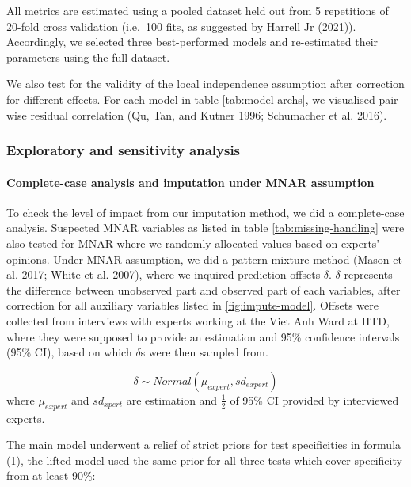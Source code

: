 \documentclass[
]{article}
\begin{document}
All metrics are estimated using a pooled dataset held out from 5 repetitions of 20-fold cross validation (i.e.~100 fits, as suggested by Harrell Jr (2021)). Accordingly, we selected three best-performed models and re-estimated their parameters using the full dataset.

We also test for the validity of the local independence assumption after correction for different effects. For each model in table \ref{tab:model-archs}, we visualised pair-wise residual correlation (Qu, Tan, and Kutner 1996; Schumacher et al. 2016).

\hypertarget{exploratory-and-sensitivity-analysis}{%
\subsubsection{Exploratory and sensitivity analysis}\label{exploratory-and-sensitivity-analysis}}

\hypertarget{complete-case-analysis-and-imputation-under-mnar-assumption}{%
\paragraph{Complete-case analysis and imputation under MNAR assumption}\label{complete-case-analysis-and-imputation-under-mnar-assumption}}

To check the level of impact from our imputation method, we did a complete-case analysis. Suspected MNAR variables as listed in table \ref{tab:missing-handling} were also tested for MNAR where we randomly allocated values based on experts' opinions. Under MNAR assumption, we did a pattern-mixture method (Mason et al. 2017; White et al. 2007), where we inquired prediction offsets \(\delta\). \(\delta\) represents the difference between unobserved part and observed part of each variables, after correction for all auxiliary variables listed in \ref{fig:impute-model}. Offsets were collected from interviews with experts working at the Viet Anh Ward at HTD, where they were supposed to provide an estimation and 95\% confidence intervals (95\% CI), based on which \(\delta\)s were then sampled from.

\[
\delta \sim Normal(\mu_{expert}, sd_{expert})
\]
where \(\mu_{expert}\) and \(sd_{xpert}\) are estimation and \(\frac{1}{2}\) of 95\% CI provided by interviewed experts.

The main model underwent a relief of strict priors for test specificities in formula (1), the lifted model used the same prior for all three tests which cover specificity from at least 90\%:
\end{document}
